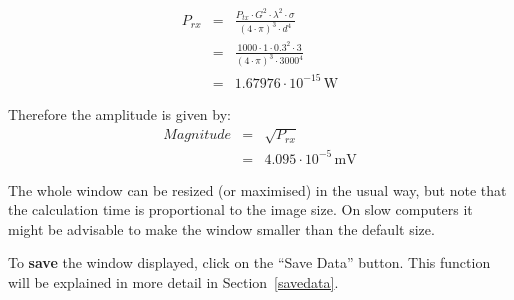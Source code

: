 \begin{eqnarray}
P_{rx} &=&\frac{P_{tx}\cdot G^{2}\cdot \lambda ^{2}\cdot \sigma }{(4\cdot
\pi )^{3}\cdot d^{4}} \\
&=&\frac{1000\cdot 1\cdot 0.3^{2}\cdot 3}{(4\cdot \pi )^{3}\cdot 3000^{4}} \\
&=&1.67976\cdot 10^{-15}\,\text{W}
\end{eqnarray}

Therefore the amplitude is given by: 
\begin{eqnarray}
Magnitude &=&\sqrt{P_{rx}} \\
&=&4.095\cdot 10^{-5}\,\text{mV}
\end{eqnarray}

The whole window can be resized (or maximised) in the usual way, but note
that the calculation time is proportional to the image size. On slow
computers it might be advisable to make the window smaller than the default
size.

To \textbf{save} the window displayed, click on the ``Save Data'' button.
This function will be explained in more detail in Section~\ref{savedata}.
